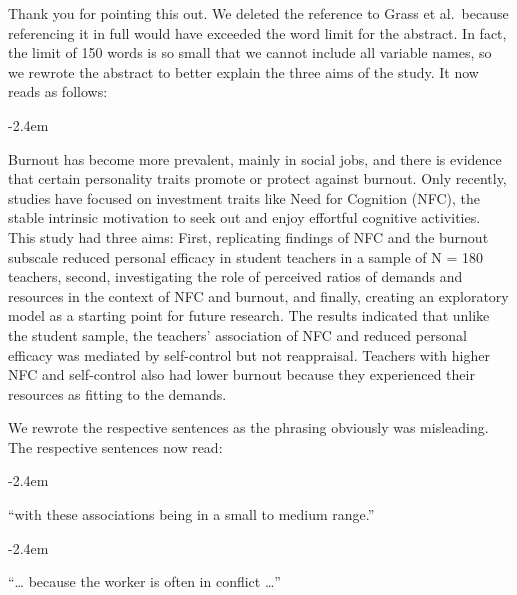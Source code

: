 \documentclass[draft]{article}
\renewenvironment{quote}{\begin{fquote}\advance\leftmargini -2.4em\begin{oldquote}}{\end{oldquote}\end{fquote}}
\newenvironment{fquote}
  {\def\FrameCommand{
	\fboxsep=0.6em %
	\fcolorbox{black}{white}}%
    \MakeFramed {\advance\hsize-2\width \FrameRestore}
    \begin{minipage}{\linewidth}
  }
  {\end{minipage}\endMakeFramed}
\begin{document}
Thank you for pointing this out.
We deleted the reference to Grass et al.~because referencing it in full would have exceeded the word limit for the abstract.
In fact, the limit of 150 words is so small that we cannot include all variable names, so we rewrote the abstract to better explain the three aims of the study.
It now reads as follows:

\begin{quote}
Burnout has become more prevalent, mainly in social jobs, and there is evidence that certain personality traits promote or protect against burnout. Only recently, studies have focused on investment traits like Need for Cognition (NFC), the stable intrinsic motivation to seek out and enjoy effortful cognitive activities. This study had three aims: First, replicating findings of NFC and the burnout subscale reduced personal efficacy in student teachers in a sample of N = 180 teachers, second, investigating the role of perceived ratios of demands and resources in the context of NFC and burnout, and finally, creating an exploratory model as a starting point for future research. The results indicated that unlike the student sample, the teachers' association of NFC and reduced personal efficacy was mediated by self-control but not reappraisal. Teachers with higher NFC and self-control also had lower burnout because they experienced their resources as fitting to the demands.
\end{quote}


We rewrote the respective sentences as the phrasing obviously was misleading. The respective sentences now read:

\begin{quote}
``with these associations being in a small to medium range.''
\end{quote}

\begin{quote}
``\ldots{} because the worker is often in conflict \ldots{}''
\end{quote}

\end{document}
